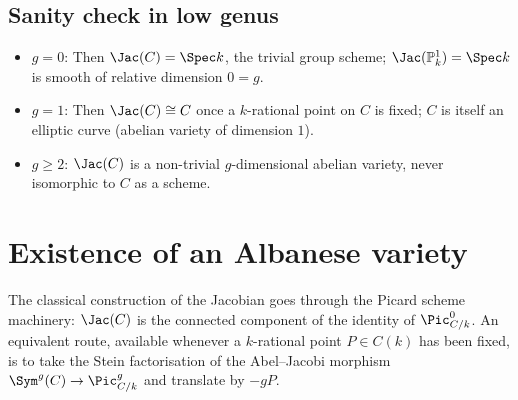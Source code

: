 \subsection{Sanity check in low genus}
\begin{itemize}
  \item \(g = 0\): Then \(\Jac(C) = \Spec k\), the trivial group scheme; \(\Jac(\mathbb P^1_k) = \Spec k\) is smooth of relative dimension \(0 = g\).
  \item \(g = 1\): Then \(\Jac(C) \cong C\) once a \(k\)-rational point on \(C\) is fixed; \(C\) is itself an elliptic curve (abelian variety of dimension \(1\)).
  \item \(g \ge 2\): \(\Jac(C)\) is a non-trivial \(g\)-dimensional abelian variety, never isomorphic to \(C\) as a scheme.
\end{itemize}
\section{Existence of an Albanese variety}
The classical construction of the Jacobian goes through the Picard scheme machinery: \(\Jac(C)\) is the connected component of the identity of \(\Pic^0_{C/k}\). An equivalent route, available whenever a \(k\)-rational point \(P \in C(k)\) has been fixed, is to take the Stein factorisation of the Abel--Jacobi morphism \(\Sym^g(C) \to \Pic^g_{C/k}\) and translate by \(-gP\).
